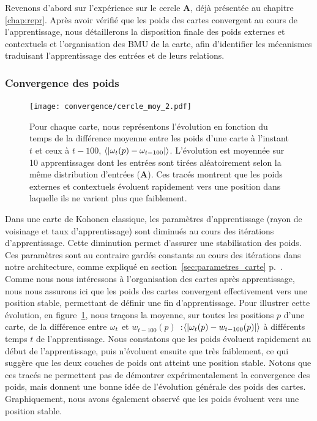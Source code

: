 \documentclass[../main]{subfiles}
\begin{document}
Revenons d'abord sur l'expérience sur le cercle \textbf{A}, déjà présentée au chapitre \ref{chap:repr}. 
Après avoir vérifié que les poids des cartes convergent au cours de l'apprentissage, nous détaillerons la disposition finale des poids externes et contextuels et l'organisation des BMU de la carte, afin d'identifier les mécanismes traduisant l'apprentissage des entrées et de leurs relations.

\subsubsection{Convergence des poids}

\begin{figure}
	\texttt{[image: convergence/cercle\_moy\_2.pdf]}
	\vspace{-0.5cm}
	\caption{Pour chaque carte, nous représentons l'évolution en fonction du temps de la différence moyenne entre les poids d'une carte à l'instant $t$ et ceux à $t-100$, $\langle|\omega_t(p) - \omega_{t-100}|\rangle$.
	L'évolution est moyennée sur 10 apprentissages dont les entrées sont tirées aléatoirement selon la même distribution d'entrées (\textbf{A}).
	Ces tracés montrent que les poids externes et contextuels évoluent rapidement vers une position dans laquelle ils ne varient plus que faiblement.\label{fig:conv}}
\end{figure}

Dans une carte de Kohonen classique, les paramètres d'apprentissage (rayon de voisinage et taux d'apprentissage) sont diminués au cours des itérations d'apprentissage. Cette diminution permet d'assurer une stabilisation des poids. Ces paramètres sont au contraire gardés constants au cours des itérations dans notre architecture, comme expliqué en section~\ref{sec:parametres_carte} p.~\pageref{sec:parametres_carte}.
Comme nous nous intéressons à l'organisation des cartes après apprentissage, nous nous assurons ici que les poids des cartes convergent effectivement vers une position stable, permettant de définir une fin d'apprentissage.
Pour illustrer cette évolution, en figure~\ref{fig:conv}, nous traçons la moyenne, sur toutes les positions $p$ d'une carte, de la différence entre $\omega_t$ et $w_{t-100}(p)$~:$\langle | \omega_t(p) - w_{t-100}(p)| \rangle $ à différents temps $t$ de l'apprentissage. Nous constatons que les poids évoluent rapidement au début de l'apprentissage, puis n'évoluent ensuite que très faiblement, ce qui suggère que les deux couches de poids ont atteint une position stable. Notons que ces tracés ne permettent pas de démontrer expérimentalement la convergence des poids, mais donnent une bonne idée de l'évolution générale des poids des cartes.
Graphiquement, nous avons également observé que les poids évoluent vers une position stable.
\end{document}
